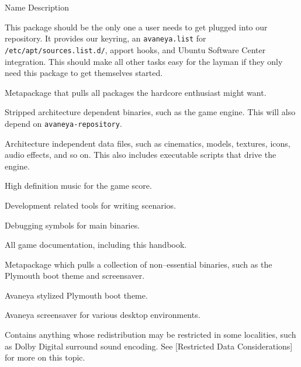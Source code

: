 {
    \bTABLE[split=repeat,option=stretch]
    \setupTABLE[column][2]
        [width=.65\textwidth,
        align=yes]
    \setupTABLE[row][each][align=center]
    \setupTABLE[7][1][align=center]

\bTABLEhead
    \bTR[bottomframe=on]
      \bTH  Name \eTH
      \bTH  Description \eTH
    \eTR
\eTABLEhead

\bTABLEbody
    \bTR
       \eTC
      \bTC This package should be the only one a user needs to get plugged into our repository. It provides our keyring, an {\tt avaneya.list} for {\tt /etc/apt/sources.list.d/}, apport hooks, and Ubuntu Software Center integration. This should make all other tasks easy for the layman if they only need this package to get themselves started. \eTC
    \eTR

    \bTR
       \eTC
      \bTC Metapackage that pulls all packages the hardcore enthusiast might want. \eTC
    \eTR

    \bTR
       \eTC
      \bTC Stripped architecture dependent binaries, such as the game engine. This will also depend on {\tt avaneya-repository}. \eTC
    \eTR

    \bTR
       \eTC
      \bTC Architecture independent data files, such as cinematics, models, 
textures, icons, audio effects, and so on. This also includes executable scripts 
that drive the engine. \eTC
    \eTR

    \bTR
       \eTC
      \bTC High definition music for the game score. \eTC
    \eTR

    \bTR
       \eTC
      \bTC Development related tools for writing scenarios. \eTC
    \eTR

    \bTR
       \eTC
      \bTC Debugging symbols for main binaries. \eTC
    \eTR

    \bTR
       \eTC
      \bTC All game documentation, including this handbook. \eTC
    \eTR

    \bTR
       \eTC
      \bTC Metapackage which pulls a collection of non--essential binaries, such as the Plymouth boot theme and screensaver. \eTC
    \eTR

    \bTR
       \eTC
      \bTC Avaneya stylized Plymouth boot theme. \eTC
    \eTR
    
    \bTR
       \eTC
      \bTC Avaneya screensaver for various desktop environments. \eTC
    \eTR

    \bTR
       \eTC
      \bTC Contains anything whose redistribution may be restricted in some localities, such as Dolby Digital surround sound encoding. See [Restricted Data Considerations] for more on this topic. \eTC
    \eTR
\eTABLEbody
\eTABLE
}

